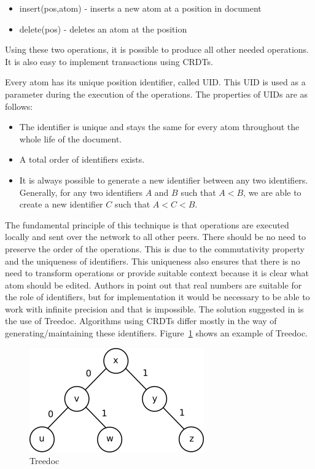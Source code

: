 \documentclass[12pt,oneside]{fithesis2}
\begin{document}
\begin{itemize}
\item insert(pos,atom) - inserts a new atom at a position in document
\item delete(pos) - deletes an atom at the position 
\end{itemize}
Using these two operations, it is possible to produce all other needed operations. It is also easy to implement transactions using CRDTs. 
\par Every atom has its unique position identifier, called UID. This UID is used as a parameter during the execution of the operations. The properties of UIDs are as follows:
\begin{itemize}
\item The identifier is unique and stays the same for every atom throughout the whole life of the document.
\item A total order of identifiers exists.
\item It is always possible to generate a new identifier between any two identifiers. Generally, for any two identifiers \(A\) and \(B\) such that \(A < B\), we are able to create a new identifier \(C\) such that \(A < C < B\).
\end{itemize}
\par The fundamental principle of this technique is that operations are executed locally and sent over the network to all other peers. There should be no need to preserve the order of the operations. This is due to the commutativity property and the uniqueness of identifiers. This uniqueness also ensures that there is no need to transform operations or provide suitable context because it is clear what atom should be edited.
Authors in \cite{Shapiro-design} point out that real numbers are suitable for the role of identifiers, but for implementation it would be necessary to be able to work with infinite precision and that is impossible. The solution suggested in \cite{Shapiro-design} is the use of Treedoc. Algorithms using CRDTs differ mostly in the way of generating/maintaining these identifiers. Figure~\ref{fig:treedoc} shows an example of Treedoc.
\begin{figure}[H]
\caption{Treedoc}
\label{fig:treedoc}
\centering
\vspace{5mm}
\includegraphics{treedoc1} 
\end{figure}
\end{document}
